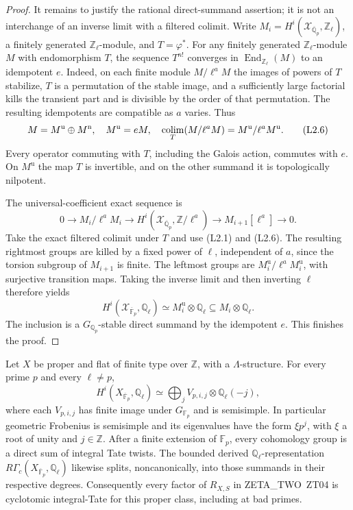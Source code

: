 \begin{proof}
It remains to justify the rational direct-summand assertion; it is
not an interchange of an inverse limit with a filtered colimit.
Write
$M_i=H^i(\mathcal X_{\overline{\mathbb Q}_p},\mathbb Z_\ell)$,
a finitely generated $\mathbb Z_\ell$-module, and $T=\varphi^*$.
For any finitely generated $\mathbb Z_\ell$-module $M$ with
endomorphism $T$, the sequence $T^{n!}$ converges in
$\operatorname{End}_{\mathbb Z_\ell}(M)$ to an idempotent $e$.
Indeed, on each finite module $M/\ell^aM$ the images of powers of $T$
stabilize, $T$ is a permutation of the stable image, and a sufficiently
large factorial kills the transient part and is divisible by the
order of that permutation.  The resulting idempotents are compatible
as $a$ varies.  Thus
\[
 M=M^{\mathrm{u}}\oplus M^{\mathrm{n}},\quad
 M^{\mathrm{u}}=eM,\quad
 \mathop{\rm colim}_T(M/\ell^aM)=M^{\mathrm{u}}/\ell^aM^{\mathrm{u}}.
 \tag{L2.6}
\]
Every operator commuting with $T$, including the Galois action,
commutes with $e$.  On $M^{\mathrm{u}}$ the map $T$ is invertible,
and on the other summand it is topologically nilpotent.

The universal-coefficient exact sequence is
\[
 0\longrightarrow M_i/\ell^aM_i\longrightarrow
 H^i(\mathcal X_{\overline{\mathbb Q}_p},\mathbb Z/\ell^a)
 \longrightarrow M_{i+1}[\ell^a]\longrightarrow0.
\]
Take the exact filtered colimit under $T$ and use (L2.1) and (L2.6).
The resulting rightmost groups are killed by a fixed power of $\ell$,
independent of $a$, since the torsion subgroup of $M_{i+1}$ is finite.
The leftmost groups are $M_i^{\mathrm{u}}/\ell^aM_i^{\mathrm{u}}$,
with surjective transition maps.  Taking the inverse limit and then
inverting $\ell$ therefore yields
\[
 H^i(\mathcal X_{\overline{\mathbb F}_p},\mathbb Q_\ell)
 \simeq M_i^{\mathrm{u}}\otimes\mathbb Q_\ell
 \subseteq M_i\otimes\mathbb Q_\ell.
 \tag{L2.7}
\]
The inclusion is a $G_{\mathbb Q_p}$-stable direct summand by the
idempotent $e$.  This finishes the proof.
\end{proof}

\begin{theorem}
\label{NX-L03}
Let $X$ be proper and flat of finite type over $\mathbb Z$, with a
$\Lambda$-structure.  For every prime $p$ and every $\ell\ne p$,
\[
 H^i(X_{\overline{\mathbb F}_p},\mathbb Q_\ell)
 \simeq\bigoplus_j V_{p,i,j}\otimes\mathbb Q_\ell(-j),
 \tag{L3.1}
\]
where each $V_{p,i,j}$ has finite image under
$G_{\mathbb F_p}$ and is semisimple.  In particular geometric
Frobenius is semisimple and its eigenvalues have the form
$\xi p^j$, with $\xi$ a root of unity and $j\in\mathbb Z$.
After a finite extension of $\mathbb F_p$, every cohomology group is
a direct sum of integral Tate twists.  The bounded derived
$\mathbb Q_\ell$-representation $R\Gamma_c(X_{\overline{\mathbb F}_p},\mathbb Q_\ell)$
likewise splits, noncanonically, into those summands in their respective
degrees.  Consequently every factor of $R_{X,S}$ in ZETA\_TWO~ZT04
is cyclotomic integral-Tate for this proper class, including at bad
primes.
\end{theorem}

